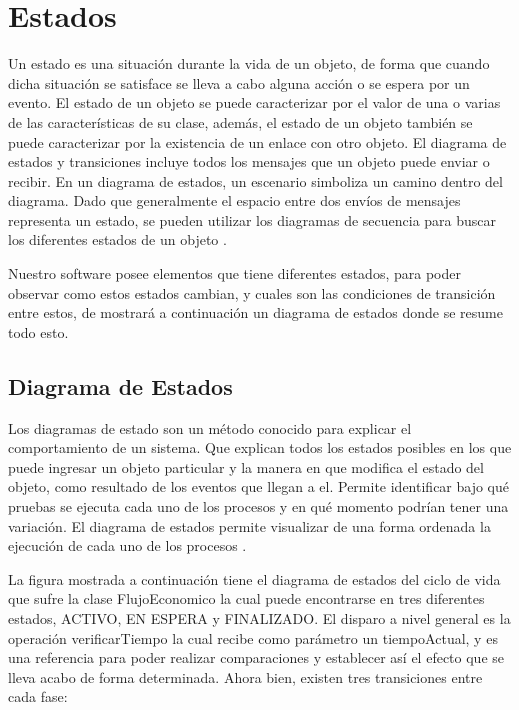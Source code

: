 \chapter{Estados}

Un estado es una situación durante la vida de un objeto, de forma que cuando dicha situación se satisface se lleva a cabo alguna acción o se espera por un evento. El estado de un objeto se puede caracterizar por el valor de una o varias de las características de su clase, además, el estado de un objeto también se puede caracterizar por la existencia de un enlace con otro objeto. El diagrama de estados y transiciones incluye todos los mensajes que un objeto puede enviar o recibir. En un diagrama de estados, un escenario simboliza un camino dentro del diagrama. Dado que generalmente el espacio entre dos envíos de mensajes representa un estado, se pueden utilizar los diagramas de secuencia para buscar los diferentes estados de un objeto \cite{Pw5DE}.

Nuestro software posee elementos que tiene diferentes estados, para poder observar como estos estados cambian, y cuales son las condiciones de transición entre estos, de mostrará a continuación un diagrama de estados donde se resume todo esto.

\section{Diagrama de Estados}

Los diagramas de estado son un método conocido para explicar el comportamiento de un sistema. Que explican todos los estados posibles en los que puede ingresar un objeto particular y la manera en que modifica el estado del objeto, como resultado de los eventos que llegan a el. Permite identificar bajo qué pruebas se ejecuta cada uno de los procesos y en qué momento podrían tener una variación. El diagrama de estados permite visualizar de una forma ordenada la ejecución de cada uno de los procesos \cite{Pw5DE}.

La figura mostrada a continuación tiene el diagrama de estados del ciclo de vida que sufre la clase FlujoEconomico la cual puede encontrarse en tres diferentes estados, ACTIVO, EN ESPERA y FINALIZADO. El disparo a nivel general es la operación verificarTiempo la cual recibe como parámetro un tiempoActual, y es una referencia para poder realizar comparaciones y establecer así el efecto que se lleva acabo de forma determinada. Ahora bien, existen tres transiciones entre cada fase:


